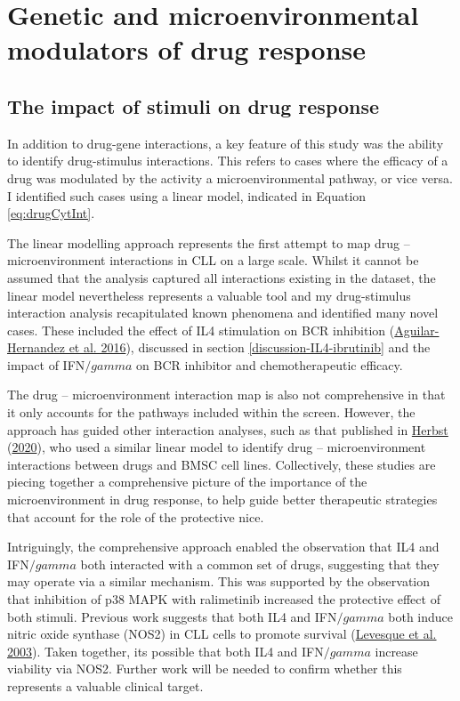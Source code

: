 \documentclass[11pt, a4paper, twosided]{book}
\begin{document}
\hypertarget{genetic-and-microenvironmental-modulators-of-drug-response}{%
\section{Genetic and microenvironmental modulators of drug response}\label{genetic-and-microenvironmental-modulators-of-drug-response}}

\hypertarget{the-impact-of-stimuli-on-drug-response}{%
\subsection{The impact of stimuli on drug response}\label{the-impact-of-stimuli-on-drug-response}}

In addition to drug-gene interactions, a key feature of this study was the ability to identify drug-stimulus interactions. This refers to cases where the efficacy of a drug was modulated by the activity a microenvironmental pathway, or vice versa. I identified such cases using a linear model, indicated in Equation \eqref{eq:drugCytInt}.

The linear modelling approach represents the first attempt to map drug -- microenvironment interactions in CLL on a large scale. Whilst it cannot be assumed that the analysis captured all interactions existing in the dataset, the linear model nevertheless represents a valuable tool and my drug-stimulus interaction analysis recapitulated known phenomena and identified many novel cases. These included the effect of IL4 stimulation on BCR inhibition (\protect\hyperlink{ref-AguilarHernandez2016}{Aguilar-Hernandez et al. 2016}), discussed in section \ref{discussion-IL4-ibrutinib} and the impact of IFN\(/gamma\) on BCR inhibitor and chemotherapeutic efficacy.

The drug -- microenvironment interaction map is also not comprehensive in that it only accounts for the pathways included within the screen. However, the approach has guided other interaction analyses, such as that published in \protect\hyperlink{ref-HerbstThesis}{Herbst} (\protect\hyperlink{ref-HerbstThesis}{2020}), who used a similar linear model to identify drug -- microenvironment interactions between drugs and BMSC cell lines. Collectively, these studies are piecing together a comprehensive picture of the importance of the microenvironment in drug response, to help guide better therapeutic strategies that account for the role of the protective nice.

Intriguingly, the comprehensive approach enabled the observation that IL4 and IFN\(/gamma\) both interacted with a common set of drugs, suggesting that they may operate via a similar mechanism. This was supported by the observation that inhibition of p38 MAPK with ralimetinib increased the protective effect of both stimuli. Previous work suggests that both IL4 and IFN\(/gamma\) both induce nitric oxide synthase (NOS2) in CLL cells to promote survival (\protect\hyperlink{ref-Levesque2003}{Levesque et al. 2003}). Taken together, its possible that both IL4 and IFN\(/gamma\) increase viability via NOS2. Further work will be needed to confirm whether this represents a valuable clinical target.
\end{document}
